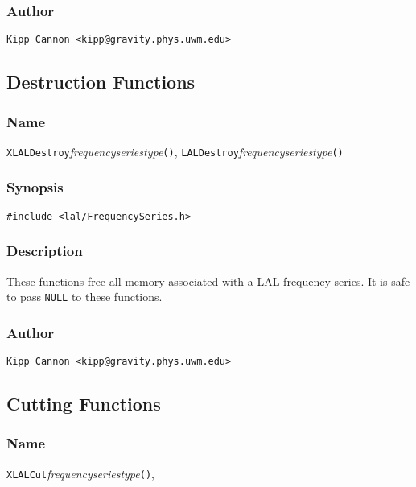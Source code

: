 \subsubsection{Author}

\verb|Kipp Cannon <kipp@gravity.phys.uwm.edu>|


\subsection{Destruction Functions}

\subsubsection{Name}

\texttt{XLALDestroy}\textit{frequencyseriestype}\texttt{()},
\texttt{LALDestroy}\textit{frequencyseriestype}\texttt{()}

\subsubsection{Synopsis}

\begin{verbatim}
#include <lal/FrequencySeries.h>
\end{verbatim}


\subsubsection{Description}

These functions free all memory associated with a LAL frequency series.  It
is safe to pass \texttt{NULL} to these functions.

\subsubsection{Author}

\verb|Kipp Cannon <kipp@gravity.phys.uwm.edu>|


\subsection{Cutting Functions}

\subsubsection{Name}

\texttt{XLALCut}\textit{frequencyseriestype}\texttt{()},

